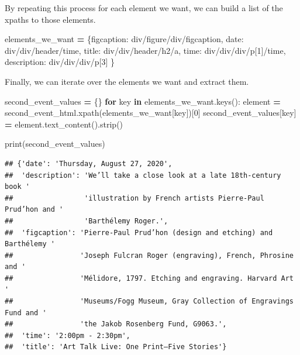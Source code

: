 \documentclass[
]{book}
\newenvironment{Shaded}{\begin{snugshade}}{\end{snugshade}}
\newcommand{\BuiltInTok}[1]{#1}
\newcommand{\ControlFlowTok}[1]{\textcolor[rgb]{0.13,0.29,0.53}{\textbf{#1}}}
\newcommand{\DecValTok}[1]{\textcolor[rgb]{0.00,0.00,0.81}{#1}}
\newcommand{\KeywordTok}[1]{\textcolor[rgb]{0.13,0.29,0.53}{\textbf{#1}}}
\newcommand{\NormalTok}[1]{#1}
\newcommand{\OperatorTok}[1]{\textcolor[rgb]{0.81,0.36,0.00}{\textbf{#1}}}
\newcommand{\StringTok}[1]{\textcolor[rgb]{0.31,0.60,0.02}{#1}}
\begin{document}
By repeating this process for each element we want, we can build a list of the xpaths to those elements.

\begin{Shaded}
\begin{Highlighting}[]
\NormalTok{elements\_we\_want }\OperatorTok{=}\NormalTok{ \{}\StringTok{\textquotesingle{}figcaption\textquotesingle{}}\NormalTok{: }\StringTok{\textquotesingle{}div/figure/div/figcaption\textquotesingle{}}\NormalTok{,}
                    \StringTok{\textquotesingle{}date\textquotesingle{}}\NormalTok{: }\StringTok{\textquotesingle{}div/div/header/time\textquotesingle{}}\NormalTok{,}
                    \StringTok{\textquotesingle{}title\textquotesingle{}}\NormalTok{: }\StringTok{\textquotesingle{}div/div/header/h2/a\textquotesingle{}}\NormalTok{,}
                    \StringTok{\textquotesingle{}time\textquotesingle{}}\NormalTok{: }\StringTok{\textquotesingle{}div/div/div/p[1]/time\textquotesingle{}}\NormalTok{,}
                    \StringTok{\textquotesingle{}description\textquotesingle{}}\NormalTok{: }\StringTok{\textquotesingle{}div/div/div/p[3]\textquotesingle{}}
\NormalTok{                    \}}
\end{Highlighting}
\end{Shaded}

Finally, we can iterate over the elements we want and extract them.

\begin{Shaded}
\begin{Highlighting}[]
\NormalTok{second\_event\_values }\OperatorTok{=}\NormalTok{ \{\}}
\ControlFlowTok{for}\NormalTok{ key }\KeywordTok{in}\NormalTok{ elements\_we\_want.keys():}
\NormalTok{    element }\OperatorTok{=}\NormalTok{ second\_event\_html.xpath(elements\_we\_want[key])[}\DecValTok{0}\NormalTok{]}
\NormalTok{    second\_event\_values[key] }\OperatorTok{=}\NormalTok{ element.text\_content().strip()}

\BuiltInTok{print}\NormalTok{(second\_event\_values)}
\end{Highlighting}
\end{Shaded}

\begin{verbatim}
## {'date': 'Thursday, August 27, 2020',
##  'description': 'We’ll take a close look at a late 18th-century book '
##                 'illustration by French artists Pierre-Paul Prud’hon and '
##                 'Barthélemy Roger.',
##  'figcaption': 'Pierre-Paul Prud’hon (design and etching) and Barthélemy '
##                'Joseph Fulcran Roger (engraving), French, Phrosine and '
##                'Mélidore, 1797. Etching and engraving. Harvard Art '
##                'Museums/Fogg Museum, Gray Collection of Engravings Fund and '
##                'the Jakob Rosenberg Fund, G9063.',
##  'time': '2:00pm - 2:30pm',
##  'title': 'Art Talk Live: One Print—Five Stories'}
\end{verbatim}
\end{document}
